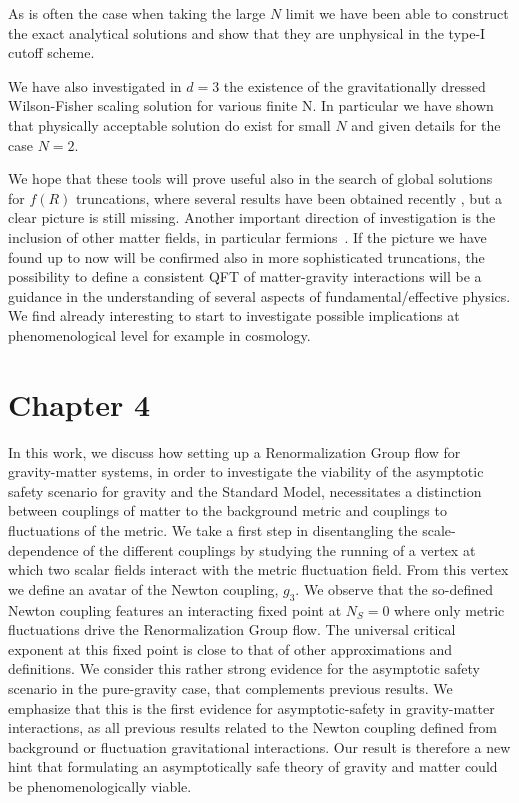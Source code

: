 \documentclass[11pt]{book}
\numberwithin{equation}{chapter}
\begin{document}
As is often the case when taking the large $N$ limit we have been
able to construct the exact analytical solutions
and show that they are unphysical in the type-I cutoff scheme.

We have also investigated in $d=3$ the existence of the gravitationally
dressed Wilson-Fisher scaling solution for various finite N.
In particular we have shown that physically acceptable solution do exist
for small $N$ and given details for the case $N=2$.

We hope that these tools will prove useful also in the search
of global solutions for $f(R)$ truncations,
where several results have been obtained recently
\cite{Benedetti:2012dx,Benedetti:2013jk,Demmel:2012ub,Dietz:2012ic,Dietz:2013sba,Demmel:2015oqa},
but a clear picture is still missing.
Another important direction of investigation is the inclusion of other matter fields,
in particular fermions~\cite{Zanusso:2009bs,Vacca:2010mj,Eichhorn:2011pc,Vacca:2015nta}.
If the picture we have found up to now will be confirmed also in more sophisticated truncations,
the possibility to define a consistent QFT of matter-gravity interactions
will be a guidance in the understanding of several aspects of fundamental/effective physics.
We find already interesting to start to investigate possible implications at
phenomenological level for example in cosmology.


\section*{Chapter 4}

In this work, we discuss how setting up a Renormalization Group flow for gravity-matter systems,
in order to investigate the viability of the asymptotic safety scenario for gravity and the Standard Model,
necessitates a distinction between couplings of matter to the background metric and couplings to
fluctuations of the metric.
We take a first step in disentangling the scale-dependence of the different couplings by studying
the running of a vertex at which two scalar fields interact with the metric fluctuation field.
From this vertex we define an avatar of the Newton coupling, $g_3$.
We observe that the so-defined Newton coupling features an interacting fixed point at $N_S=0$
where only metric fluctuations drive the Renormalization Group flow.
The universal critical exponent at this fixed point is close to that of other approximations and definitions.
We consider this rather strong evidence for the asymptotic safety scenario  in the pure-gravity case,
that complements previous results.
We emphasize that this is the first evidence for asymptotic-safety in gravity-matter interactions,
as all previous results related to the Newton coupling defined from background or fluctuation
gravitational interactions.
Our result is therefore a new hint that formulating an asymptotically safe theory of gravity
and matter could be phenomenologically viable.
\end{document}
